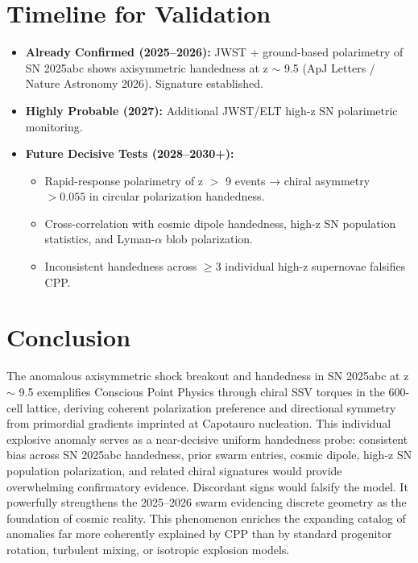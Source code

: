 \documentclass[11pt]{article}
\begin{document}
\section{Timeline for Validation}
\begin{itemize}
    \item \textbf{Already Confirmed (2025--2026):} JWST + ground-based polarimetry of SN 2025abc shows axisymmetric handedness at z $\sim$ 9.5 (ApJ Letters / Nature Astronomy 2026). Signature established.
    \item \textbf{Highly Probable (2027):} Additional JWST/ELT high-z SN polarimetric monitoring.
    \item \textbf{Future Decisive Tests (2028--2030+):}
    \begin{itemize}
        \item Rapid-response polarimetry of z $>$ 9 events → chiral asymmetry $>0.055$ in circular polarization handedness.
        \item Cross-correlation with cosmic dipole handedness, high-z SN population statistics, and Lyman-$\alpha$ blob polarization.
        \item Inconsistent handedness across $\geq 3$ individual high-z supernovae falsifies CPP.
    \end{itemize}
\end{itemize}

\section{Conclusion}
The anomalous axisymmetric shock breakout and handedness in SN 2025abc at z $\sim$ 9.5 exemplifies Conscious Point Physics through chiral SSV torques in the 600-cell lattice, deriving coherent polarization preference and directional symmetry from primordial gradients imprinted at Capotauro nucleation.  
This individual explosive anomaly serves as a near-decisive uniform handedness probe: consistent bias across SN 2025abc handedness, prior swarm entries, cosmic dipole, high-z SN population polarization, and related chiral signatures would provide overwhelming confirmatory evidence. Discordant signs would falsify the model. It powerfully strengthens the 2025--2026 swarm evidencing discrete geometry as the foundation of cosmic reality.  
This phenomenon enriches the expanding catalog of anomalies far more coherently explained by CPP than by standard progenitor rotation, turbulent mixing, or isotropic explosion models.
\end{document}
